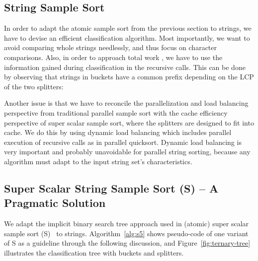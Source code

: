 \documentclass[a4paper]{myjournal}
\begin{document}
\subsection{String Sample Sort}\label{sec:ss-string}

In order to adapt the atomic sample sort from the previous section to strings,
we have to devise an efficient classification algorithm.  Most importantly, we
want to avoid comparing whole strings needlessly, and thus focus on character
comparisons.  Also, in order to approach total work , we have to
use the information gained during classification in the recursive calls. This
can be done by observing that strings in buckets have a common prefix depending
on the LCP of the two splitters:

Another issue is that we have to reconcile the parallelization and load
balancing perspective from traditional parallel sample sort with the cache
efficiency perspective of super scalar sample sort, where the splitters are
designed to fit into cache. We do this by using dynamic load balancing which
includes parallel execution of recursive calls as in parallel quicksort. Dynamic
load balancing is very important and probably unavoidable for parallel string
sorting, because any algorithm must adapt to the input string set's
characteristics.

\subsection{Super Scalar String Sample Sort (\texorpdfstring{S}{S5}) -- A Pragmatic Solution}

We adapt the implicit binary search tree approach used in (atomic) super scalar
sample sort (S)~\cite{sanders2004super} to strings.  Algorithm~\ref{alg:s5}
shows pseudo-code of one variant of S as a guideline through the following
discussion, and Figure~\ref{fig:ternary-tree} illustrates the classification
tree with buckets and splitters.
\end{document}
